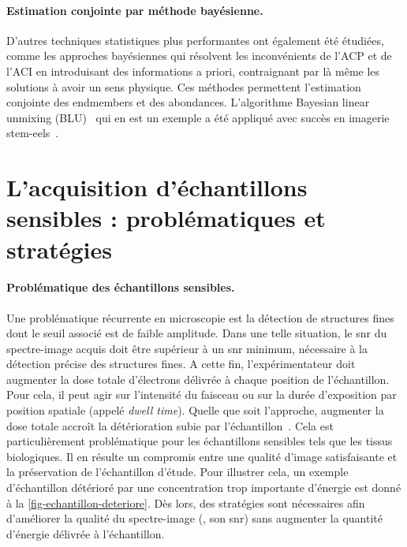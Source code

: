     \paragraph{Estimation conjointe par méthode bayésienne.} D'autres techniques statistiques plus performantes ont également été étudiées, comme les approches bayésiennes qui résolvent les inconvénients de l'ACP et de l'ACI en introduisant des informations a priori, contraignant par là même les solutions à avoir un sens physique. Ces méthodes permettent l'estimation conjointe des endmembers et des abondances. L'algorithme Bayesian linear unmixing (BLU)~\cite{dobigeon2009joint} qui en est un exemple a été appliqué avec succès en imagerie \gls{stem}-\gls{eels}~\cite{dobigeon2012spectral}.
    
    
    \section{L'acquisition d'échantillons sensibles : problématiques et stratégies}\label{sec-ech-sensibles}

    \paragraph{Problématique des échantillons sensibles.} Une problématique récurrente en microscopie est la détection de structures fines dont le seuil associé est de faible amplitude. Dans une telle situation, le \gls{snr} du spectre-image acquis doit être supérieur à un \gls{snr} minimum, nécessaire à la détection précise des structures fines. A cette fin, l'expérimentateur doit augmenter la dose totale d'électrons délivrée à chaque position de l'échantillon. Pour cela, il peut agir sur l'intensité du faisceau ou sur la durée d'exposition par position spatiale (appelé \emph{dwell time}). Quelle que soit l'approche, augmenter la dose totale accroît la détérioration subie par l'échantillon~\cite{egerton2004radiation}. Cela est particulièrement problématique pour les échantillons sensibles tels que les tissus biologiques. 
    Il en résulte un compromis entre une qualité d'image satisfaisante et la préservation de l'échantillon d'étude. Pour illustrer cela, un exemple d'échantillon détérioré par une concentration trop importante d'énergie est donné à la \cref{fig-echantillon-deteriore}. Dès lors, des stratégies sont nécessaires afin d'améliorer la qualité du spectre-image (\ie{}, son \gls{snr}) sans augmenter la quantité d'énergie délivrée à l'échantillon.

